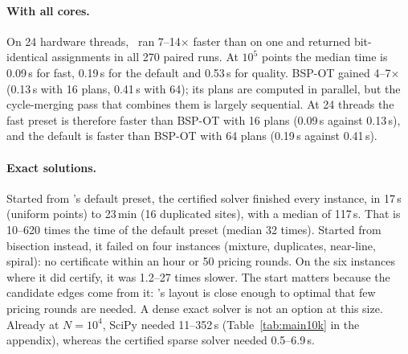 \paragraph{With all cores.} On 24 hardware threads, \ShuffleSnap\ ran 7--14$\times$ faster than on
one and returned bit-identical assignments in all 270 paired runs. At $10^5$ points the
median time is 0.09\,s for fast, 0.19\,s for the default and 0.53\,s for quality.
BSP-OT gained 4--7$\times$ (0.13\,s with 16 plans, 0.41\,s with 64); its plans are computed
in parallel, but the cycle-merging pass that combines them is largely sequential. At 24
threads the fast preset is therefore faster than BSP-OT with 16 plans (0.09\,s against
0.13\,s), and the default is faster than BSP-OT with 64 plans (0.19\,s against 0.41\,s).

\paragraph{Exact solutions.} Started from \ShuffleSnap's default preset, the certified solver
finished every instance, in 17\,s (uniform points) to 23\,min (16 duplicated sites), with a
median of 117\,s. That is 10--620 times the time of the default preset (median 32 times).
Started from bisection instead, it failed on four instances (mixture, duplicates,
near-line, spiral): no certificate within an hour or 50 pricing rounds. On the six
instances where it did certify, it was 1.2--27 times slower. The start matters because the
candidate edges come from it: \ShuffleSnap's layout is close enough to optimal that few
pricing rounds are needed. A dense exact solver is not an option at this size. Already at
$N=10^4$, SciPy needed 11--352\,s (Table~\ref{tab:main10k} in the appendix), whereas the
certified sparse solver needed 0.5--6.9\,s.
